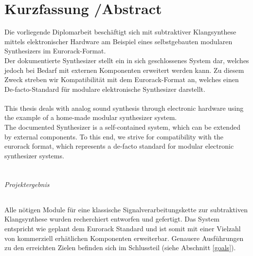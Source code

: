 \chapter*{Kurzfassung /Abstract }
\label{cha:abstract}

Die vorliegende Diplomarbeit beschäftigt sich mit subtraktiver Klangsynthese mittels elektronischer Hardware am Beispiel eines selbstgebauten modularen Synthesizers im Eurorack-Format. \\

Der dokumentierte Synthesizer stellt ein in sich geschlossenes System dar, welches jedoch bei Bedarf mit externen Komponenten erweitert werden kann. Zu diesem Zweck streben wir Kompatibilität mit dem Eurorack-Format an, welches einen De-facto-Standard für modulare elektronische Synthesizer darstellt. \\ \\


This thesis deals with analog sound synthesis through electronic hardware using the example of a home-made modular synthesizer system. \\

The documented Synthesizer is a self-contained system, which can be extended by external components. To this end, we strive for compatibility with the eurorack format, which represents a de-facto standard for modular electronic synthesizer systems. \\ \\


\subparagraph{Projektergebnis}
Alle nötigen Module für eine klassische Signalverarbeitungskette zur subtraktiven Klangsynthese wurden recherchiert entworfen und gefertigt. Das System entspricht wie geplant dem Eurorack Standard und ist somit mit einer Vielzahl von kommerziell erhätlichen Komponenten erweiterbar. Genauere Ausführungen zu den erreichten Zielen befinden sich im Schlussteil (siehe Abschnitt \ref{goals}).
